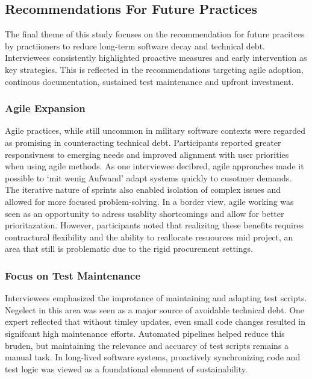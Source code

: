 \subsection{Recommendations For Future Practices}
The final theme of this study focuses on the recommendation for future pracitces by practiioners to reduce long-term software decay and technical debt. Interviewees consistently highlighted proactive measures and early intervention as key strategies. This is reflected in the recommendations targeting agile adoption, continous documentation, sustained test maintenance and upfront investment.

\subsubsection{Agile Expansion}
Agile practices, while still uncommon in military software contexts were regarded as promising in counteracting technical debt. Participants reported greater responsivness to emerging needs and improved alignment with user priorities when using agile methods.
As one interviewee decibred, agile approaches made it possible to `mit wenig Aufwand' adapt systems quickly to cusotmer demands. The iterative nature of sprints also enabled isolation of complex issues and allowed for more focused problem-solving.
In a border view, agile working was seen as an opportunity to adress usablity shortcomings and allow for better prioritazation. However, participants noted that realizitng these benefits requires contractural flexibility and the ability to reallocate resuources mid project, an area that still is problematic due to the rigid procurement settings.\\

\subsubsection{Focus on Test Maintenance}
Interviewees emphasized the improtance of maintaining and adapting test scripts. Negelect in this area was seen as a major source of avoidable technical debt. One expert reflected that without timley updates, even small code changes resulted in signifcant high maintenance efforts.
Automated pipelines helped reduce this bruden, but maintaining the relevance and accuarcy of test scripts remains a manual task. In long-lived software systems, proactively synchronizing code and test logic was viewed as a foundational elemnent of sustainability.\\

